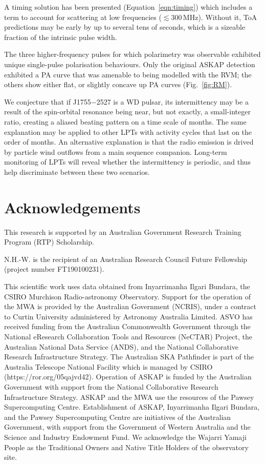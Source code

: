 \documentclass[fleqn,usenatbib]{mnras}
\newcommand{\revision}[2]{{\color{red}#2}}
\newcommand{\src}{J1755$-$2527}
\newcommand{\Fig}{Fig.}
\newcommand{\Eqn}{Equation}
\begin{document}
A timing solution has been presented (\Eqn~\ref{eqn:timing}) which includes a term to account for scattering at low frequencies ($\lesssim 300\,$MHz).
Without it, ToA predictions may be early by up to several tens of seconds, which is a sizeable fraction of the intrinsic pulse width.

The three higher-frequency pulses for which polarimetry was observable exhibited unique single-pulse polarisation behaviours.
Only the original ASKAP detection exhibited a PA curve that was amenable to being modelled with the RVM; the others show either flat, or slightly concave up PA curves (\Fig~\ref{fig:RM}).

We conjecture that if \src{} is a WD pulsar, its intermittency may be a result of the spin-orbital resonance being near, but not exactly, a small-integer ratio, creating a aliased beating pattern on a time scale of months.
The same explanation may be applied to other LPTs with activity cycles that last on the order of months.
An alternative explanation is that the radio emission is drived by particle wind outflows from \revision{the}{a} main sequence companion.
Long-term monitoring of LPTs will reveal whether the intermittency is periodic, and thus help discriminate between these two scenarios.

\section*{Acknowledgements}

This research is supported by an Australian Government Research Training Program (RTP) Scholarship.

N.H.-W. is the recipient of an Australian Research Council Future Fellowship (project number FT190100231).
 
This scientific work uses data obtained from Inyarrimanha Ilgari Bundara, the CSIRO Murchison Radio-astronomy Observatory. Support for the operation of the MWA is provided by the Australian Government (NCRIS), under a contract to Curtin University administered by Astronomy Australia Limited. ASVO has received funding from the Australian Commonwealth Government through the National eResearch Collaboration Tools and Resources (NeCTAR) Project, the Australian National Data Service (ANDS), and the National Collaborative Research Infrastructure Strategy.
The Australian SKA Pathfinder is part of the Australia Telescope National Facility which is managed by CSIRO (https://ror.org/05qajvd42). Operation of ASKAP is funded by the Australian Government with support from the National Collaborative Research Infrastructure Strategy. ASKAP and the MWA use the resources of the Pawsey Supercomputing Centre. Establishment of ASKAP, Inyarrimanha Ilgari Bundara, and the Pawsey Supercomputing Centre are initiatives of the Australian Government, with support from the Government of Western Australia and the Science and Industry Endowment Fund. We acknowledge the Wajarri Yamaji People as the Traditional Owners and Native Title Holders of the observatory site.
\end{document}
